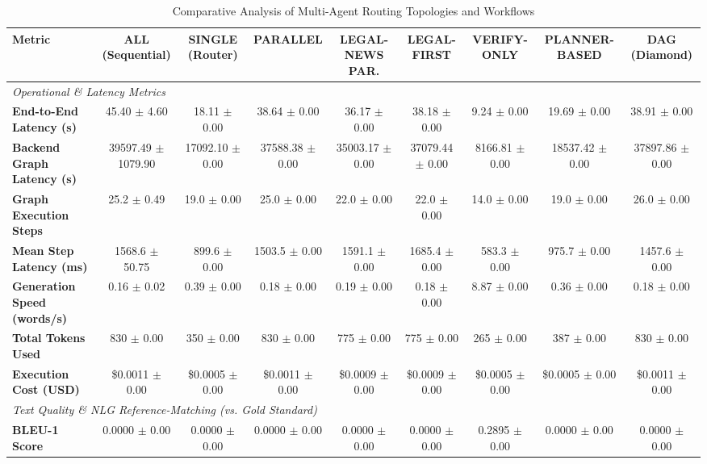 \begin{table}[t]
\centering
\caption{Comparative Analysis of Multi-Agent Routing Topologies and Workflows}
\label{tab:agent_workflows_eval}
\small
\begin{tabular}{lcccccccc}
\toprule
\textbf{Metric} & \textbf{ALL (Sequential)} & \textbf{SINGLE (Router)} & \textbf{PARALLEL} & \textbf{LEGAL-NEWS PAR.} & \textbf{LEGAL-FIRST} & \textbf{VERIFY-ONLY} & \textbf{PLANNER-BASED} & \textbf{DAG (Diamond)} \\
\midrule
\multicolumn{9}{l}{\textit{Operational \& Latency Metrics}} \\
\textbf{End-to-End Latency (s)} & 45.40 $\pm$ 4.60 & 18.11 $\pm$ 0.00 & 38.64 $\pm$ 0.00 & 36.17 $\pm$ 0.00 & 38.18 $\pm$ 0.00 & 9.24 $\pm$ 0.00 & 19.69 $\pm$ 0.00 & 38.91 $\pm$ 0.00 \\
\textbf{Backend Graph Latency (s)} & 39597.49 $\pm$ 1079.90 & 17092.10 $\pm$ 0.00 & 37588.38 $\pm$ 0.00 & 35003.17 $\pm$ 0.00 & 37079.44 $\pm$ 0.00 & 8166.81 $\pm$ 0.00 & 18537.42 $\pm$ 0.00 & 37897.86 $\pm$ 0.00 \\
\textbf{Graph Execution Steps} & 25.2 $\pm$ 0.49 & 19.0 $\pm$ 0.00 & 25.0 $\pm$ 0.00 & 22.0 $\pm$ 0.00 & 22.0 $\pm$ 0.00 & 14.0 $\pm$ 0.00 & 19.0 $\pm$ 0.00 & 26.0 $\pm$ 0.00 \\
\textbf{Mean Step Latency (ms)} & 1568.6 $\pm$ 50.75 & 899.6 $\pm$ 0.00 & 1503.5 $\pm$ 0.00 & 1591.1 $\pm$ 0.00 & 1685.4 $\pm$ 0.00 & 583.3 $\pm$ 0.00 & 975.7 $\pm$ 0.00 & 1457.6 $\pm$ 0.00 \\
\textbf{Generation Speed (words/s)} & 0.16 $\pm$ 0.02 & 0.39 $\pm$ 0.00 & 0.18 $\pm$ 0.00 & 0.19 $\pm$ 0.00 & 0.18 $\pm$ 0.00 & 8.87 $\pm$ 0.00 & 0.36 $\pm$ 0.00 & 0.18 $\pm$ 0.00 \\
\textbf{Total Tokens Used} & 830 $\pm$ 0.00 & 350 $\pm$ 0.00 & 830 $\pm$ 0.00 & 775 $\pm$ 0.00 & 775 $\pm$ 0.00 & 265 $\pm$ 0.00 & 387 $\pm$ 0.00 & 830 $\pm$ 0.00 \\
\textbf{Execution Cost (USD)} & \$0.0011 $\pm$ 0.00 & \$0.0005 $\pm$ 0.00 & \$0.0011 $\pm$ 0.00 & \$0.0009 $\pm$ 0.00 & \$0.0009 $\pm$ 0.00 & \$0.0005 $\pm$ 0.00 & \$0.0005 $\pm$ 0.00 & \$0.0011 $\pm$ 0.00 \\
\midrule
\multicolumn{9}{l}{\textit{Text Quality \& NLG Reference-Matching (vs. Gold Standard)}} \\
\textbf{BLEU-1 Score} & 0.0000 $\pm$ 0.00 & 0.0000 $\pm$ 0.00 & 0.0000 $\pm$ 0.00 & 0.0000 $\pm$ 0.00 & 0.0000 $\pm$ 0.00 & 0.2895 $\pm$ 0.00 & 0.0000 $\pm$ 0.00 & 0.0000 $\pm$ 0.00 \\

\end{tabular}
\end{table}

